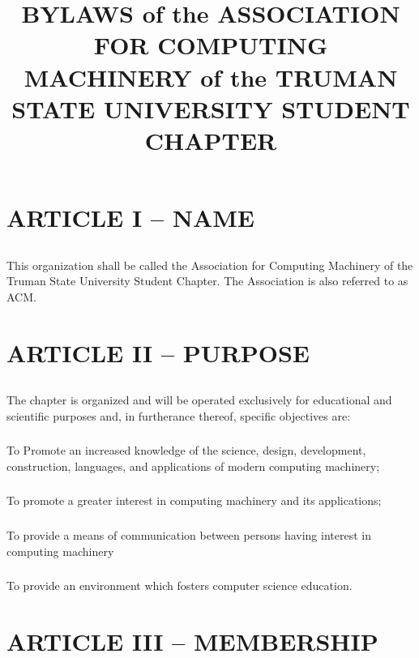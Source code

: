 \documentclass[12pt]{article}
\title{BYLAWS
of the
ASSOCIATION FOR COMPUTING MACHINERY
of the
TRUMAN STATE UNIVERSITY STUDENT CHAPTER}
\begin{document}
	\maketitle
	
	\thispagestyle{empty}
	
		
\section{ARTICLE I – NAME}
\subsection{}	This organization shall be called the Association for Computing Machinery of the Truman State University Student Chapter. The Association is also referred to as ACM.

\section{ARTICLE II – PURPOSE}
\subsection{}	The chapter is organized and will be operated exclusively for educational and scientific purposes and, in furtherance thereof, specific objectives are:
\subsubsection{}	To Promote an increased knowledge of the science, design, development, construction, languages, and applications of modern computing machinery;
\subsubsection{}	To promote a greater interest in computing machinery and its applications;
\subsubsection{}	To provide a means of communication between persons having interest in computing machinery
\subsubsection{}	To provide an environment which fosters computer science education.

\section{ARTICLE III – MEMBERSHIP}
	
\end{document}

